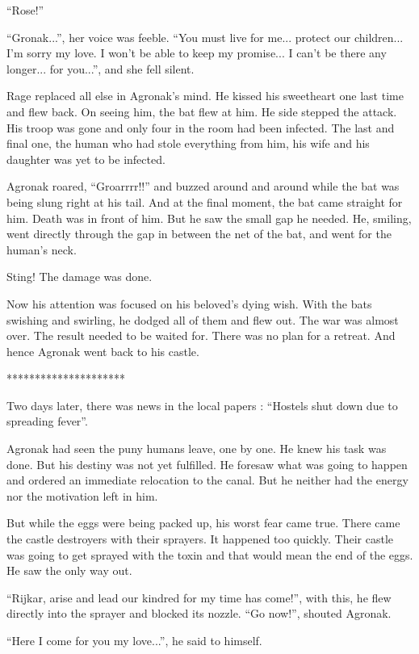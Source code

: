 \documentclass[twoside,11pt,titlepage]{article}
\begin{document}
``Rose!''

``Gronak...'', her voice was feeble. ``You must live for me... protect our children... I'm sorry my love. I won't be able to keep my promise... I can't be there any longer... for you...'', and she fell silent.

Rage replaced all else in Agronak's mind. He kissed his sweetheart one last time and flew back. On seeing him, the bat flew at him. He side stepped the attack. His troop was gone and only four in the room had been infected. The last and final one, the human who had stole everything from him, his wife and his daughter was yet to be infected.

Agronak roared, ``Groarrrr!!'' and buzzed around and around while the bat was being slung right at his tail. And at the final moment, the bat came straight for him. Death was in front of him. But he saw the small gap he needed. He, smiling, went directly through the gap in between the net of the bat, and went for the human's neck.

Sting! The damage was done.

Now his attention was focused on his beloved's dying wish. With the bats swishing and swirling, he dodged all of them and flew out. The war was almost over. The result needed to be waited for. There was no plan for a retreat. And hence Agronak went back to his castle.

\bigskip
\begin{center}
*********************
\end{center}


Two days later, there was news in the local papers : ``Hostels shut down due to spreading fever''.

Agronak had seen the puny humans leave, one by one. He knew his task was done. But his destiny was not yet fulfilled. He foresaw what was going to happen and ordered an immediate relocation to the canal. But he neither had the energy nor the motivation left in him.

But while the eggs were being packed up, his worst fear came true. There came the castle destroyers with their sprayers. It happened too quickly. Their castle was going to get sprayed with the toxin and that would mean the end of the eggs. He saw the only way out.

``Rijkar, arise and lead our kindred for my time has come!'', with this, he flew directly into the sprayer and blocked its nozzle. ``Go now!'', shouted Agronak.

``Here I come for you my love...'', he said to himself.
\end{document}
